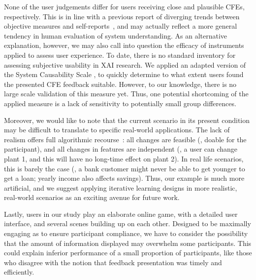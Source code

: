None of the user judgements differ for users receiving close and plausible \glspl{CFE}, respectively.
This is in line with a previous report of diverging trends between objective measures and self-reports~\citep{van_der_waa_evaluating_2021}, and may actually reflect a more general tendency in human evaluation of system understanding.
As an alternative explanation, however, we may also call into question the efficacy of instruments applied to assess user experience. 
To date, there is no standard inventory for assessing subjective usability in \gls{XAI} research.
We applied an adapted version of the System Causability Scale \cite{holzinger_measuring_2020}, to quickly determine to what extent users found the presented \gls{CFE} feedback suitable.
However, to our knowledge, there is no large scale validation of this measure yet.
Thus, one potential shortcoming of the applied measure is a lack of sensitivity to potentially small group differences.

Moreover, we would like to note that the current scenario in its present condition may be difficult to translate to specific real-world applications.
The lack of realism offers full algorithmic recourse~\citep{karimi_survey_2020}: all changes are feasible (\ie, doable for the participant), and all changes in features are independent (\ie, a user can change plant 1, and this will have no long-time effect on plant 2).
In real life scenarios, this is barely the case (\eg, a bank customer might never be able to get younger to get a loan; yearly income also affects savings). 
Thus, our example is much more artificial, and we suggest applying iterative learning designs in more realistic, real-world scenarios as an exciting avenue for future work.

Lastly, users in our study play an elaborate online game, with a detailed user interface, and several scenes building up on each other.
Designed to be maximally engaging as to ensure participant compliance, we have to consider the possibility that the amount of information displayed may overwhelm some participants.
This could explain inferior performance of a small proportion of participants, like those who disagree with the notion that feedback presentation was timely and efficiently.

